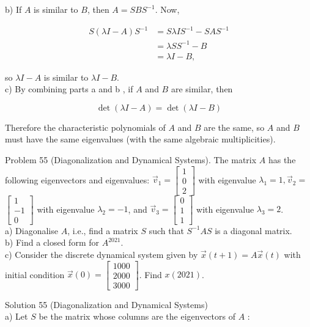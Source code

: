 \documentclass[10pt]{article}
\begin{document}
b) If $A$ is similar to $B$, then $A=S B S^{-1}$. Now,

$$
\begin{aligned}
S(\lambda I-A) S^{-1} & =S \lambda I S^{-1}-S A S^{-1} \\
& =\lambda S S^{-1}-B \\
& =\lambda I-B,
\end{aligned}
$$

so $\lambda I-A$ is similar to $\lambda I-B$.\\
c) By combining parts a and b , if $A$ and $B$ are similar, then

$$
\operatorname{det}(\lambda I-A)=\operatorname{det}(\lambda I-B)
$$

Therefore the characteristic polynomials of $A$ and $B$ are the same, so $A$ and $B$ must have the same eigenvalues (with the same algebraic multiplicities).

Problem 55 (Diagonalization and Dynamical Systems). The matrix $A$ has the following eigenvectors and eigenvalues: $\vec{v}_{1}=\left[\begin{array}{l}1 \\ 0 \\ 2\end{array}\right]$ with eigenvalue $\lambda_{1}=1, \vec{v}_{2}=$ $\left[\begin{array}{c}1 \\ -1 \\ 0\end{array}\right]$ with eigenvalue $\lambda_{2}=-1$, and $\vec{v}_{3}=\left[\begin{array}{l}0 \\ 1 \\ 1\end{array}\right]$ with eigenvalue $\lambda_{3}=2$.\\
a) Diagonalise $A$, i.e., find a matrix $S$ such that $S^{-1} A S$ is a diagonal matrix.\\
b) Find a closed form for $A^{2021}$.\\
c) Consider the discrete dynamical system given by $\vec{x}(t+1)=A \vec{x}(t)$ with initial condition $\vec{x}(0)=\left[\begin{array}{l}1000 \\ 2000 \\ 3000\end{array}\right]$. Find $x(2021)$.

Solution 55 (Diagonalization and Dynamical Systems)\\
a) Let $S$ be the matrix whose columns are the eigenvectors of $A$ :
\end{document}
